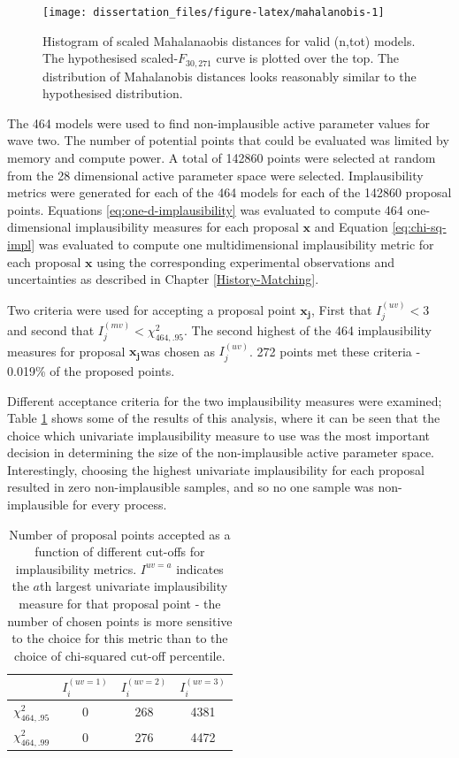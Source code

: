 \documentclass[
  12pt,
  a4paper,
  twoside]{book}
\begin{document}
\begin{figure}[H]

{\centering \texttt{[image: dissertation\_files/figure-latex/mahalanobis-1]} 

}

\caption{Histogram of scaled Mahalanaobis distances for valid (n,tot) models. The hypothesised scaled-$F_{30,271}$ curve is plotted over the top. The distribution of Mahalanobis distances looks reasonably similar to the hypothesised distribution.}\label{fig:mahalanobis}
\end{figure}

The 464 models were used to find non-implausible active parameter values for wave two. The number of potential points that could be evaluated was limited by memory and compute power. A total of 142860 points were selected at random from the 28 dimensional active parameter space were selected. Implausibility metrics were generated for each of the 464 models for each of the 142860 proposal points. Equations \eqref{eq:one-d-implausibility} was evaluated to compute 464 one-dimensional implausibility measures for each proposal \(\mathbf{x}\) and Equation \eqref{eq:chi-sq-impl} was evaluated to compute one multidimensional implausibility metric for each proposal \(\mathbf{x}\) using the corresponding experimental observations and uncertainties as described in Chapter \ref{History-Matching}.

Two criteria were used for accepting a proposal point \(\mathbf{x_j}\), First that \(I_j^{(uv)}<3\) and second that \(I^{(mv)}_j < \chi^2_{464,.95}\). The second highest of the 464 implausibility measures for proposal \(\mathbf{x_j}\)was chosen as \(I_j^{(uv)}\). 272 points met these criteria - 0.019\% of the proposed points.

Different acceptance criteria for the two implausibility measures were examined; Table \ref{tab:cutoffs} shows some of the results of this analysis, where it can be seen that the choice which univariate implausibility measure to use was the most important decision in determining the size of the non-implausible active parameter space. Interestingly, choosing the highest univariate implausibility for each proposal resulted in zero non-implausible samples, and so no one sample was non-implausible for every process.

\begin{table}\centering
\caption{Number of proposal points accepted as a function of different cut-offs for implausibility metrics. $I^{uv=a}$ indicates the $a$th largest univariate implausibility measure for that proposal point - the number of chosen points is more sensitive to the choice for this metric than to the choice of chi-squared cut-off percentile.}
\label{tab:cutoffs}
\begin{tabular}{cccc}\\
&$I_i^{(uv=1)}$&$I_i^{(uv=2)}$&$I_i^{(uv=3)}$\\
\hline
$\chi^2_{464,.95}$& 0 & 268 & 4381 \\
$\chi^2_{464,.99}$& 0 & 276  & 4472 \\
\hline
\end{tabular}
\end{table}
\end{document}
